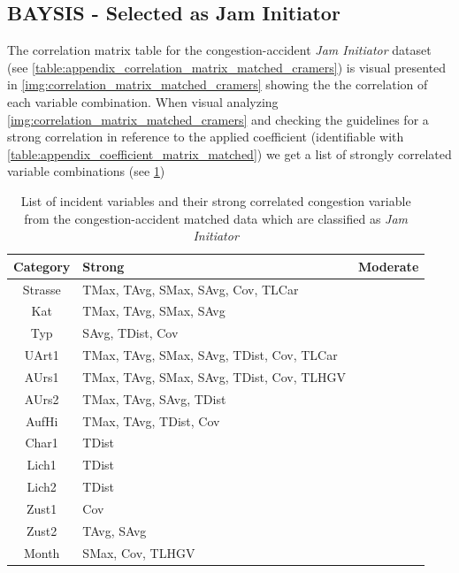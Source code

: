 \subsection{BAYSIS - Selected as Jam Initiator}
\label{analysis_processing_correlation_baysis_initiator}
The correlation matrix table for the congestion-accident \textit{Jam Initiator} dataset (see \cref{table:appendix_correlation_matrix_matched_cramers}) is visual presented in \cref{img:correlation_matrix_matched_cramers} showing the the correlation of each variable combination. When visual analyzing \cref{img:correlation_matrix_matched_cramers} and checking the guidelines for a strong correlation in reference to the applied coefficient (identifiable with \cref{table:appendix_coefficient_matrix_matched}) we get a list of strongly correlated variable combinations (see \cref{tbl:correlation_list_baysis_initiator})

\noindent
\begin{table}[ht]
	\centering
	\begin{tabular}{c|l|l}  
		\toprule
		\textbf{Category} & \textbf{Strong} & \textbf{Moderate} \\
		\midrule
		Strasse & TMax, TAvg, SMax, SAvg, Cov, TLCar & \\ 
 		Kat & TMax, TAvg, SMax, SAvg & \\ 
 		Typ & SAvg, TDist, Cov & \\
 		UArt1 & TMax, TAvg, SMax, SAvg, TDist, Cov, TLCar & \\
 		AUrs1 & TMax, TAvg, SMax, SAvg, TDist, Cov, TLHGV & \\
 		AUrs2 & TMax, TAvg, SAvg, TDist & \\
 		AufHi & TMax, TAvg, TDist, Cov & \\
 		Char1 & TDist & \\
 		Lich1 & TDist & \\
 		Lich2 & TDist & \\
 		Zust1 & Cov & \\
 		Zust2 & TAvg, SAvg & \\
 		Month & SMax, Cov, TLHGV & \\
 		\bottomrule
	\end{tabular}
	\caption{List of incident variables and their strong correlated congestion variable from the congestion-accident matched data which are classified as \textit{Jam Initiator}}
	\label{tbl:correlation_list_baysis_initiator}
\end{table}

